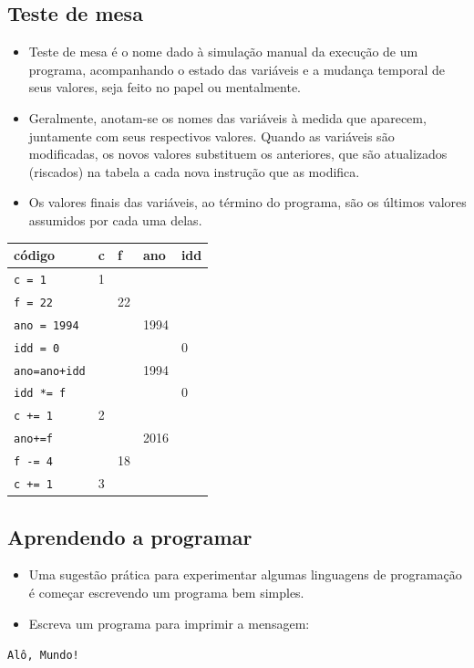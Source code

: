 \documentclass[12pt,a4paper]{article}
\begin{document}
    \hypertarget{teste-de-mesa}{%
\subsection{Teste de mesa}\label{teste-de-mesa}}

    \begin{itemize}
\item
  Teste de mesa é o nome dado à simulação manual da execução de um
  programa, acompanhando o estado das variáveis e a mudança temporal de
  seus valores, seja feito no papel ou mentalmente.
\item
  Geralmente, anotam-se os nomes das variáveis à medida que aparecem,
  juntamente com seus respectivos valores. Quando as variáveis são
  modificadas, os novos valores substituem os anteriores, que são
  atualizados (riscados) na tabela a cada nova instrução que as
  modifica.
\item
  Os valores finais das variáveis, ao término do programa, são os
  últimos valores assumidos por cada uma delas.
\end{itemize}

\begin{longtable}[]{@{}lllll@{}}
\toprule
código & c & f & ano & idd\tabularnewline
\midrule
\endhead
\texttt{c\ =\ 1} & 1 & & &\tabularnewline
\texttt{f\ =\ 22} & & 22 & &\tabularnewline
\texttt{ano\ =\ 1994} & & & 1994 &\tabularnewline
\texttt{idd\ =\ 0} & & & & 0\tabularnewline
\texttt{ano=ano+idd} & & & 1994 &\tabularnewline
\texttt{idd\ *=\ f} & & & & 0\tabularnewline
\texttt{c\ +=\ 1} & 2 & & &\tabularnewline
\texttt{ano+=f} & & & 2016 &\tabularnewline
\texttt{f\ -=\ 4} & & 18 & &\tabularnewline
\texttt{c\ +=\ 1} & 3 & & &\tabularnewline
\bottomrule
\end{longtable}

    \hypertarget{aprendendo-a-programar}{%
\subsection{Aprendendo a programar}\label{aprendendo-a-programar}}

    \begin{itemize}
\item
  Uma sugestão prática para experimentar algumas linguagens de
  programação é começar escrevendo um programa bem simples.
\item
  Escreva um programa para imprimir a mensagem:
\end{itemize}

\texttt{Alô,\ Mundo!}
\end{document}
